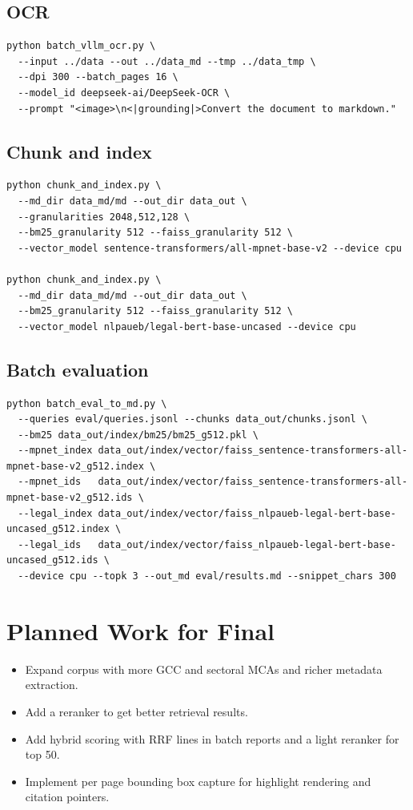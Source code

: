 \documentclass[11pt]{article}
\begin{document}
\subsection{OCR}
\begin{verbatim}
python batch_vllm_ocr.py \
  --input ../data --out ../data_md --tmp ../data_tmp \
  --dpi 300 --batch_pages 16 \
  --model_id deepseek-ai/DeepSeek-OCR \
  --prompt "<image>\n<|grounding|>Convert the document to markdown."
\end{verbatim}

\subsection{Chunk and index}
\begin{verbatim}
python chunk_and_index.py \
  --md_dir data_md/md --out_dir data_out \
  --granularities 2048,512,128 \
  --bm25_granularity 512 --faiss_granularity 512 \
  --vector_model sentence-transformers/all-mpnet-base-v2 --device cpu

python chunk_and_index.py \
  --md_dir data_md/md --out_dir data_out \
  --bm25_granularity 512 --faiss_granularity 512 \
  --vector_model nlpaueb/legal-bert-base-uncased --device cpu
\end{verbatim}

\subsection{Batch evaluation}
\begin{verbatim}
python batch_eval_to_md.py \
  --queries eval/queries.jsonl --chunks data_out/chunks.jsonl \
  --bm25 data_out/index/bm25/bm25_g512.pkl \
  --mpnet_index data_out/index/vector/faiss_sentence-transformers-all-mpnet-base-v2_g512.index \
  --mpnet_ids   data_out/index/vector/faiss_sentence-transformers-all-mpnet-base-v2_g512.ids \
  --legal_index data_out/index/vector/faiss_nlpaueb-legal-bert-base-uncased_g512.index \
  --legal_ids   data_out/index/vector/faiss_nlpaueb-legal-bert-base-uncased_g512.ids \
  --device cpu --topk 3 --out_md eval/results.md --snippet_chars 300
\end{verbatim}


\section{Planned Work for Final}
\begin{itemize}[leftmargin=1.2em]
  \item Expand corpus with more GCC and sectoral MCAs and richer metadata extraction.
  \item Add a reranker to get better retrieval results.
  \item Add hybrid scoring with RRF lines in batch reports and a light reranker for top 50.
  \item Implement per page bounding box capture for highlight rendering and citation pointers.
\end{itemize}
\end{document}
